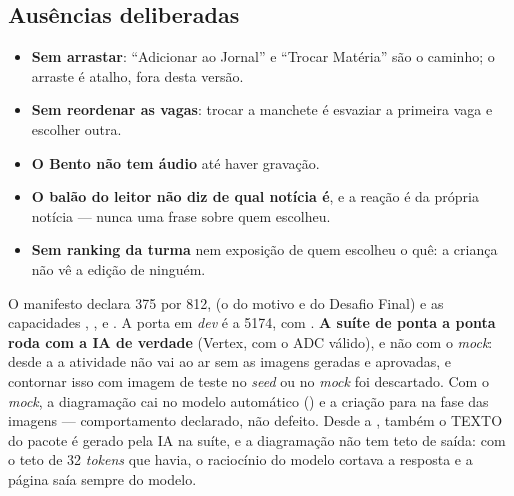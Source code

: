 \subsection{Ausências deliberadas}

\begin{itemize}
  \item \textbf{Sem arrastar}: \enquote{Adicionar ao Jornal} e \enquote{Trocar
    Matéria} são o caminho; o arraste é atalho, fora desta versão.
  \item \textbf{Sem reordenar as vagas}: trocar a manchete é esvaziar a
    primeira vaga e escolher outra.
  \item \textbf{O Bento não tem áudio} até haver gravação.
  \item \textbf{O balão do leitor não diz de qual notícia é}, e a reação é da
    própria notícia --- nunca uma frase sobre quem escolheu.
  \item \textbf{Sem ranking da turma} nem exposição de quem escolheu o quê: a
    criança não vê a edição de ninguém.
\end{itemize}

\begin{atencao}
O manifesto declara  375 por 812,  (o
 do motivo e do Desafio Final) e as capacidades ,
,  e . A porta em \emph{dev} é a 5174, com
. \textbf{A suíte de ponta a ponta roda com a IA de verdade}
(Vertex, com o ADC válido), e não com o \emph{mock}: desde a  a
atividade não vai ao ar sem as imagens geradas e aprovadas, e contornar isso
com imagem de teste no \emph{seed} ou no \emph{mock} foi descartado. Com o
\emph{mock}, a diagramação cai no modelo automático () e a
criação para na fase das imagens --- comportamento declarado, não defeito. Desde
a , também o TEXTO do pacote é gerado pela IA na suíte, e a
diagramação não tem teto de saída: com o teto de 32 \emph{tokens} que havia, o
raciocínio do modelo cortava a resposta e a página saía sempre do modelo.
\end{atencao}

